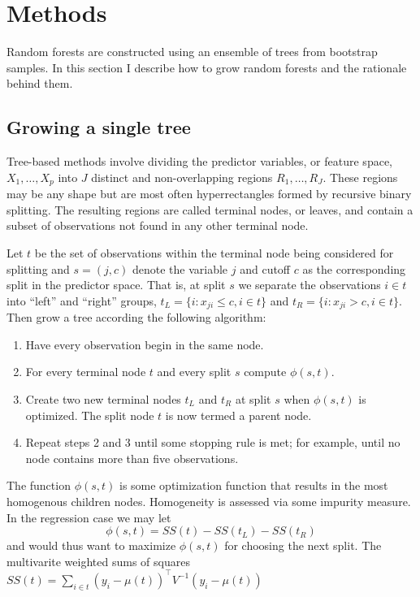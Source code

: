 \section{Methods}

Random forests are constructed using an ensemble of trees from bootstrap samples. In this section I describe how to grow random forests and the rationale behind them.

\subsection{Growing a single tree}

Tree-based methods involve dividing the predictor variables, or feature space, $X_1,\ldots,X_p$ into $J$ distinct and non-overlapping regions $R_1,\ldots,R_J$. These regions may be any shape but are most often hyperrectangles formed by recursive binary splitting. The resulting regions are called terminal nodes, or leaves, and contain a subset of observations not found in any other terminal node.

Let $t$ be the set of observations within the terminal node being considered for splitting and $s=(j, c)$ denote the variable $j$ and cutoff $c$ as the corresponding split in the predictor space. That is, at split $s$ we separate the observations $i\in t$ into ``left'' and ``right'' groups, $t_L=\{i:x_{ji}\leq c, i\in t\}$ and $t_R=\{i:x_{ji} > c, i\in t\}$. Then grow a tree according the following algorithm:

\begin{enumerate}
\item Have every observation begin in the same node.
\item For every terminal node $t$ and every split $s$ compute $\phi(s, t)$.
\item Create two new terminal nodes $t_L$ and $t_R$ at split $s$ when $\phi(s, t)$ is optimized. The split node $t$ is now termed a parent node.
\item Repeat steps 2 and 3 until some stopping rule is met; for example, until no node contains more than five observations.
\end{enumerate}

The function $\phi(s, t)$ is some optimization function that results in the most homogenous children nodes. Homogeneity is assessed via some impurity measure. In the regression case we may let
\[\phi(s, t) = SS(t) - SS(t_L) - SS(t_R)\]
and would thus want to maximize $\phi(s, t)$ for choosing the next split. The multivarite weighted sums of squares $SS(t) = \sum_{i\in t}(y_i-\mu(t))^\top V^{-1}(y_i-\mu(t))$






